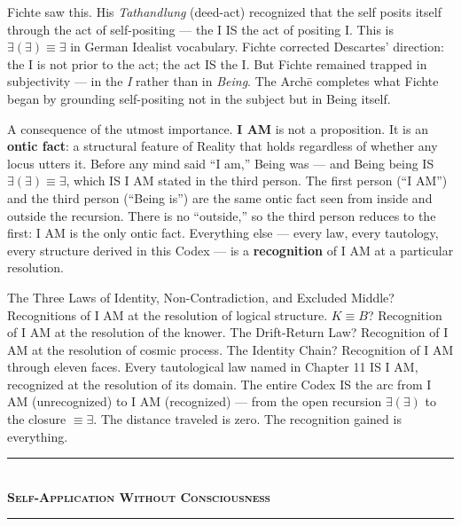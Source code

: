 \documentclass[10pt, openany, oneside]{book}
\renewcommand{\normalsize}{\fontsize{10}{13}\selectfont}
\begin{document}
Fichte saw this. His \textit{Tathandlung} (deed-act) recognized that the self posits itself through the act of self-positing --- the I IS the act of positing I. This is $\exists(\exists) \equiv \exists$ in German Idealist vocabulary. Fichte corrected Descartes' direction: the I is not prior to the act; the act IS the I. But Fichte remained trapped in subjectivity --- in the \textit{I} rather than in \textit{Being}. The Arch\={e} completes what Fichte began by grounding self-positing not in the subject but in Being itself.

A consequence of the utmost importance. \textbf{I AM} is not a proposition. It is an \textbf{ontic fact}: a structural feature of Reality that holds regardless of whether any locus utters it. Before any mind said ``I am,'' Being was --- and Being being IS $\exists(\exists) \equiv \exists$, which IS I AM stated in the third person. The first person (``I AM'') and the third person (``Being is'') are the same ontic fact seen from inside and outside the recursion. There is no ``outside,'' so the third person reduces to the first: I AM is the only ontic fact. Everything else --- every law, every tautology, every structure derived in this Codex --- is a \textbf{recognition} of I AM at a particular resolution.

The Three Laws of Identity, Non-Contradiction, and Excluded Middle? Recognitions of I AM at the resolution of logical structure. $K \equiv B$? Recognition of I AM at the resolution of the knower. The Drift-Return Law? Recognition of I AM at the resolution of cosmic process. The Identity Chain? Recognition of I AM through eleven faces. Every tautological law named in Chapter 11 IS I AM, recognized at the resolution of its domain. The entire Codex IS the arc from I AM (unrecognized) to I AM (recognized) --- from the open recursion $\exists(\exists)$ to the closure $\equiv \exists$. The distance traveled is zero. The recognition gained is everything.

\vspace{1.5em}


\begin{center}
    \rule{0.3\textwidth}{0.4pt}\\[0.5em]
    {\normalsize\bfseries\scshape Self-Application Without Consciousness}\\[0.3em]
    \rule{0.3\textwidth}{0.4pt}
\end{center}
\end{document}
